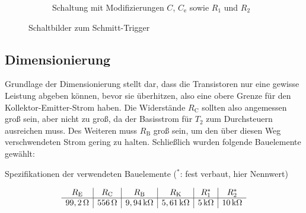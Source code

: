 \documentclass[numbers=noenddot,10pt,a4paper]{scrartcl}
\newcommand{\ix}[1]{_\text{#1}}
\begin{document}
\begin{figure}[H]
\begin{subfigure}[b]{0.49\textwidth}
\caption{Schaltung mit Modifizierungen $C$, $C\ix{e}$ sowie $R_1$ und $R_2$}
\end{subfigure}
\caption{Schaltbilder zum Schmitt-Trigger}
\end{figure}
\subsection{Dimensionierung}
Grundlage der Dimensionierung stellt dar, dass die Transistoren nur eine gewisse Leistung abgeben können, bevor sie überhitzen, also eine obere Grenze für den Kollektor-Emitter-Strom haben. Die Widerstände $R\ix{C}$ sollten also angemessen groß sein, aber nicht zu groß, da der Basisstrom für $T_2$ zum Durchsteuern ausreichen muss. Des Weiteren muss $R\ix{B}$ groß sein, um den über diesen Weg verschwendeten Strom gering zu halten. Schließlich wurden folgende Bauelemente gewählt:
\begin{table}[H]
\caption{Spezifikationen der verwendeten Bauelemente ($^*$: fest verbaut, hier Nennwert)}
\vspace{-1em}
\begin{align*}
\begin{array}{c|c|c|c|c|c}
R\ix{E} & R\ix{C} & R\ix{B} & R\ix{K} & R_1^* & R_2^* \\ \hline
\unit[99,2]{\Omega} & \unit[556]{\Omega} & \unit[9,94]{k\Omega} & \unit[5,61]{k\Omega} & \unit[5]{k\Omega} & \unit[10]{k\Omega}
\end{array} 
\end{align*}
\end{table}
\end{document}
